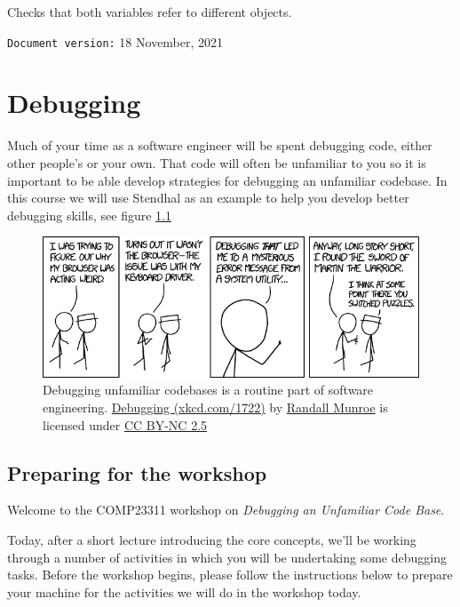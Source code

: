 \documentclass[
]{book}
\begin{document}
Checks that both variables refer to different objects.

\texttt{Document\ version:} 18 November, 2021

\hypertarget{debugging}{%
\chapter{Debugging}\label{debugging}}

Much of your time as a software engineer will be spent debugging code, either other people's or your own. That code will often be unfamiliar to you so it is important to be able develop strategies for debugging an unfamiliar codebase. In this course we will use Stendhal as an example to help you develop better debugging skills, see figure \ref{fig:xkcd-debugging-fig}

\begin{figure}

{\centering \includegraphics[width=0.99\linewidth]{images/debugging} 

}

\caption{Debugging unfamiliar codebases is a routine part of software engineering. \href{https://xkcd.com/1722/}{Debugging (xkcd.com/1722)} by \href{https://en.wikipedia.org/wiki/Randall_Munroe}{Randall Munroe} is licensed under \href{https://creativecommons.org/licenses/by-nc/2.5/}{CC BY-NC 2.5}}\label{fig:xkcd-debugging-fig}
\end{figure}



\hypertarget{preparing-for-the-workshop}{%
\section{Preparing for the workshop}\label{preparing-for-the-workshop}}

Welcome to the COMP23311 workshop on \emph{Debugging an Unfamiliar Code Base}.

Today, after a short lecture introducing the core concepts, we'll be working through a number of activities in which you will be undertaking some debugging tasks. Before the workshop begins, please follow the instructions below to prepare your machine for the activities we will do in the workshop today.
\end{document}
